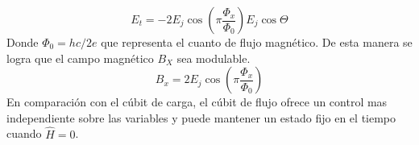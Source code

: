 \begin{equation}
    \label{Energia de tunelamiento}
    E_t = -2E_j\cos(\pi\frac{\Phi_x}{\Phi_0})E_j\cos\Theta
  \end{equation}
  Donde $\Phi_0 = hc/2e$ que representa el cuanto de flujo magnético. De esta manera se logra que el campo magnético $B_X$ sea modulable. 
  \begin{equation}
    \label{Energia magnetica modulable}
    B_x = 2E_j\cos(\pi\frac{\Phi_x}{\Phi_0})
  \end{equation}
  En comparación con el cúbit de carga, el cúbit de flujo ofrece un control mas independiente sobre las variables y puede mantener un estado fijo en el tiempo cuando $\widehat{H} =0$.
